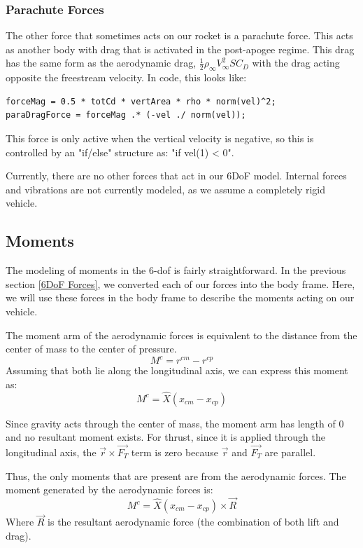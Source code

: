 \documentclass[12pt]{report}
\begin{document}
\subsubsection{Parachute Forces}
The other force that sometimes acts on our rocket is a parachute force. This acts as another body with drag that is activated in the post-apogee regime. This drag has the same form as the aerodynamic drag, $\frac{1}{2}\rho_{\infty} V_{\infty}^2SC_D$ with the drag acting opposite the freestream velocity. In code, this looks like:
\begin{lstlisting}[style=Matlab-editor]
forceMag = 0.5 * totCd * vertArea * rho * norm(vel)^2;
paraDragForce = forceMag .* (-vel ./ norm(vel)); 
\end{lstlisting}
This force is only active when the vertical velocity is negative, so this is controlled by an "if/else" structure as: "if vel(1) < 0". 

Currently, there are no other forces that act in our 6DoF model. Internal forces and vibrations are not currently modeled, as we assume a completely rigid vehicle.
\subsection{Moments}
The modeling of moments in the 6-\gls{dof} is fairly straightforward. In the previous section \ref{6DoF Forces}, we converted each of our forces into the body frame. Here, we will use these forces in the body frame to describe the moments acting on our vehicle. 

The moment arm of the aerodynamic forces is equivalent to the distance from the center of mass to the center of pressure. 
\begin{equation}
    M^c=r^{cm}-r^{cp}
\end{equation}
Assuming that both lie along the longitudinal axis, we can express this moment as:
\begin{equation}
    M^c=\hat{X}(x_{cm}-x_{cp})
\end{equation}

Since gravity acts through the center of mass, the moment arm has length of 0 and no resultant moment exists. For thrust, since it is applied through the longitudinal axis, the $\vec{r}\times \vec{F_T}$ term is zero because $\vec{r}$ and $\vec{F_T}$ are parallel.

Thus, the only moments that are present are from the aerodynamic forces. The moment generated by the aerodynamic forces is:
\begin{equation}
    M^c=\hat{X}(x_{cm}-x_{cp})\times \vec{R}
\end{equation}
Where $\vec{R}$ is the resultant aerodynamic force (the combination of both lift and drag).
\end{document}
